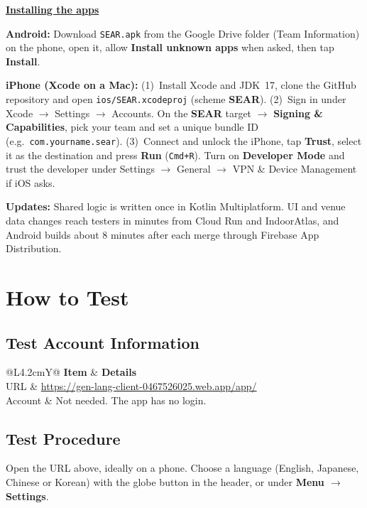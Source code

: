 \documentclass[11pt,a4paper]{article}
\begin{document}
\noindent\textbf{\underline{Installing the apps}}\par\vspace{3pt}
\noindent\textbf{Android:} Download \texttt{SEAR.apk} from the Google Drive folder (Team Information)
on the phone, open it, allow \textbf{Install unknown apps} when asked, then tap \textbf{Install}.

\smallskip
\noindent\textbf{iPhone (Xcode on a Mac):} (1)~Install Xcode and JDK~17, clone the GitHub repository
and open \texttt{ios/SEAR.xcodeproj} (scheme \textbf{SEAR}). (2)~Sign in under Xcode
$\rightarrow$ Settings $\rightarrow$ Accounts. On the \textbf{SEAR} target $\rightarrow$
\textbf{Signing \& Capabilities}, pick your team and set a unique bundle ID (e.g.\
\texttt{com.yourname.sear}). (3)~Connect and unlock the iPhone, tap \textbf{Trust}, select it
as the destination and press \textbf{Run} (\texttt{Cmd+R}). Turn on \textbf{Developer Mode} and
trust the developer under Settings $\rightarrow$ General $\rightarrow$ VPN \& Device Management
if iOS asks.

\smallskip
\noindent\textbf{Updates:} Shared logic is written once in Kotlin Multiplatform. UI and venue data changes
reach testers in minutes from Cloud Run and IndoorAtlas, and Android builds about 8 minutes after
each merge through Firebase App Distribution.

\section{How to Test}

\subsection{Test Account Information}

\noindent
\begin{tabularx}{\textwidth}{@{}L{4.2cm}Y@{}}
\toprule
\textbf{Item} & \textbf{Details} \\
\midrule
URL           & \url{https://gen-lang-client-0467526025.web.app/app/} \\
Account       & Not needed. The app has no login. \\
\bottomrule
\end{tabularx}

\subsection{Test Procedure}
Open the URL above, ideally on a phone. Choose a language (English, Japanese, Chinese or
Korean) with the globe button in the header, or under \textbf{Menu $\rightarrow$ Settings}.
\end{document}
